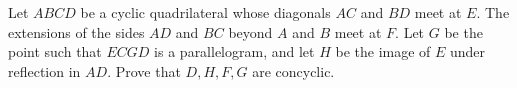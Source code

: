 Let 
$ABCD$
 be a cyclic quadrilateral whose diagonals 
$AC$
 and 
$BD$
 meet at 
$E$.
 The extensions of the sides 
$AD$
 and 
$BC$
 beyond 
$A$
 and 
$B$
 meet at 
$F$.
 Let 
$G$
 be the point such that 
$ECGD$
 is a parallelogram, and let 
$H$
 be the image of 
$E$
 under reflection in 
$AD$.
 Prove that 
$D,H,F,G$
 are concyclic.
